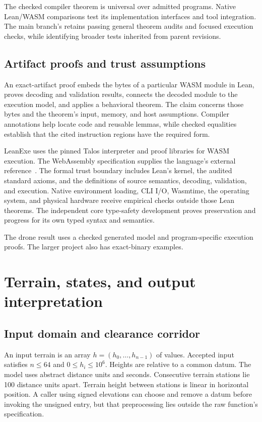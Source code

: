 \documentclass[11pt]{article}
\begin{document}
The checked compiler theorem is universal over admitted programs.  Native Lean/WASM comparisons test its implementation interfaces and tool integration.  The main branch's  retains passing general theorem audits and focused execution checks, while identifying broader tests inherited from parent revisions.

\subsection{Artifact proofs and trust assumptions}

An exact-artifact proof embeds the bytes of a particular WASM module in Lean, proves decoding and validation results, connects the decoded module to the execution model, and applies a behavioral theorem.  The claim concerns those bytes and the theorem's input, memory, and host assumptions.  Compiler annotations help locate code and reusable lemmas, while checked equalities establish that the cited instruction regions have the required form.

LeanExe uses the pinned Talos interpreter and proof libraries for WASM execution.  The WebAssembly specification supplies the language's external reference~\cite{wasm}.  The formal trust boundary includes Lean's kernel, the audited standard axioms, and the definitions of source semantics, decoding, validation, and execution.  Native environment loading, CLI I/O, Wasmtime, the operating system, and physical hardware receive empirical checks outside those Lean theorems.  The independent core type-safety development proves preservation and progress for its own typed syntax and semantics.

The drone result uses a checked generated model and program-specific execution proofs.  The larger project also has exact-binary examples.

\section{Terrain, states, and output interpretation}
\label{sec:model}

\subsection{Input domain and clearance corridor}

An input terrain is an array $h=(h_0,\ldots,h_{n-1})$ of  values.  Accepted input satisfies $n\leq64$ and $0\leq h_i\leq10^6$.  Heights are relative to a common datum.  The model uses abstract distance units and seconds.  Consecutive terrain stations lie 100 distance units apart.  Terrain height between stations is linear in horizontal position.  A caller using signed elevations can choose and remove a datum before invoking the unsigned entry, but that preprocessing lies outside the raw function's specification.
\end{document}
